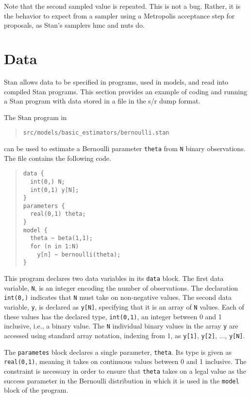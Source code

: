 \documentclass[10pt]{report}
\newcommand{\Stan}{Stan\xspace}
\newcommand{\acronym}[1]{{\sc #1}\xspace}
\newcommand{\R}{\acronym{r}}
\newcommand{\SPLUS}{\acronym{s}}
\newcommand{\HMC}{\acronym{hmc}}
\newcommand{\NUTS}{\acronym{nuts}}
\newcommand{\code}[1]{{\tt #1}}
\begin{document}
Note that the second sampled value is repeated.  This is not a bug.
Rather, it is the behavior to expect from a sampler using a Metropolis
acceptance step for proposals, as Stan's samplers \HMC and \NUTS do.

\section{Data}

\Stan allows data to be specified in programs, used in models, and
read into compiled \Stan programs. This section provides an example of
coding and running a \Stan program with data stored in a file in the
\SPLUS/\R dump format.

The Stan program in 
\begin{quote}
\begin{Verbatim}
src/models/basic_estimators/bernoulli.stan
\end{Verbatim}
\end{quote}
can be used to estimate a Bernoulli parameter \code{theta} from
\code{N} binary observations.  The file contains the following code.
%
\begin{quote}
\begin{Verbatim}
data {
  int(0,) N;
  int(0,1) y[N];
}
parameters {
  real(0,1) theta;
}
model {
  theta ~ beta(1,1);
  for (n in 1:N)
    y[n] ~ bernoulli(theta);
}
\end{Verbatim}
\end{quote}
%
This program declares two data variables in its \code{data} block.
The first data variable, \code{N}, is an integer encoding the number
of observations.  The declaration \code{int(0,)} indicates that
\code{N} must take on non-negative values.  The second data variable,
\code{y}, is declared as \code{y[N]}, specifying that it is an array
of \code{N} values.  Each of these values has the declared type,
\code{int(0,1)}, an integer between 0 and 1 inclusive, i.e., a binary
value.  The \code{N} individual binary values in the array \code{y}
are accessed using standard array notation, indexing from 1, as \code{y[1]},
\code{y[2]}, ..., \code{y[N]}.

The \code{parametes} block declares a single parameter, \code{theta}.
Its type is given as \code{real(0,1)}, meaning it takes on continuous
values between 0 and 1 inclusive.  The constraint is necessary in
order to ensure that \code{theta} takes on a legal value as the
success parameter in the Bernoulli distribution in which it is used in
the \code{model} block of the program.
\end{document}
